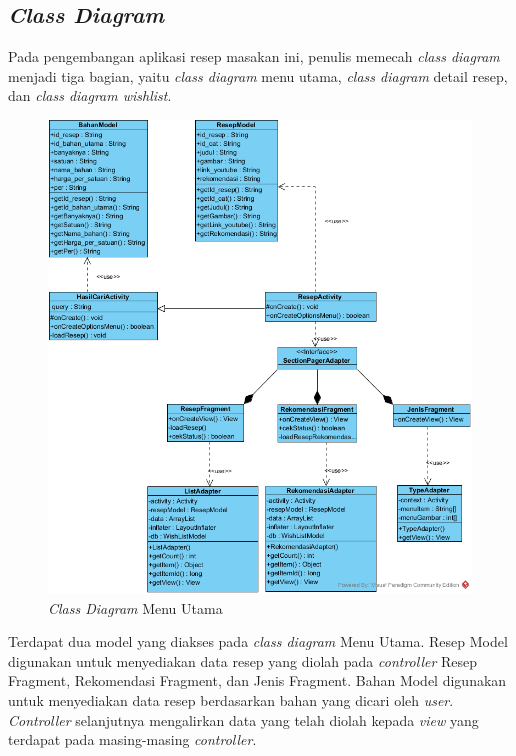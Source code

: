 	\subsection{\emph{Class Diagram}}
		Pada pengembangan aplikasi resep masakan ini, penulis memecah \textit{class diagram} menjadi tiga bagian, yaitu \textit{class diagram} menu utama, \textit{class diagram} detail resep, dan \textit{class diagram wishlist}.
		\begin{figure}[H]
			\centering
			\includegraphics[origin=c,width=1\textwidth]{gambar/class/MenuUtama}
			\caption{\emph{Class Diagram} Menu Utama}
		\end{figure}
		\vspace{1cm}
		Terdapat dua model yang diakses pada \textit{class diagram} Menu Utama. Resep Model digunakan untuk menyediakan data resep yang diolah pada \textit{controller} Resep Fragment, Rekomendasi Fragment, dan Jenis Fragment. Bahan Model digunakan untuk menyediakan data resep berdasarkan bahan yang dicari oleh \textit{user}.  \textit{Controller} selanjutnya mengalirkan data yang telah diolah kepada \textit{view} yang terdapat pada masing-masing \textit{controller}.   
